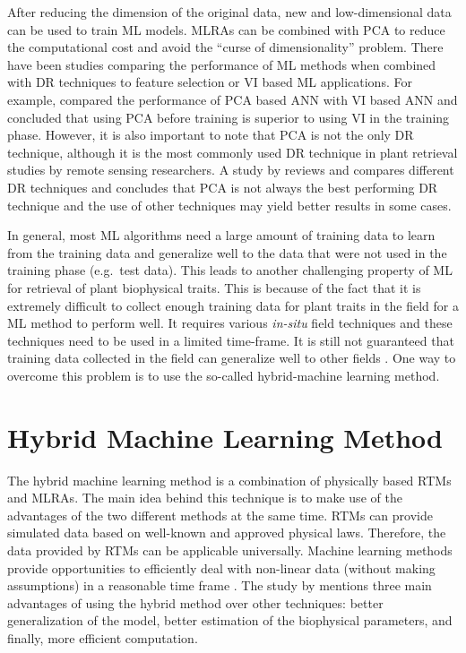 \documentclass[a4paper, twoside]{templates/ociamthesis}
\begin{document}
After reducing the dimension of the original data, new and low-dimensional data can be used to train ML models. MLRAs can be combined with PCA to reduce the computational cost and avoid the ``curse of dimensionality'' problem. There have been studies comparing the performance of ML methods when combined with DR techniques to feature selection or VI based ML applications. For example, \citet{liu2017hyperspectral} compared the performance of PCA based ANN with VI based ANN and concluded that using PCA before training is superior to using VI in the training phase. However, it is also important to note that PCA is not the only DR technique, although it is the most commonly used DR technique in plant retrieval studies by remote sensing researchers. A study by \citet{rivera2017hyperspectral} reviews and compares different DR techniques and concludes that PCA is not always the best performing DR technique and the use of other techniques may yield better results in some cases.

In general, most ML algorithms need a large amount of training data to learn from the training data and generalize well to the data that were not used in the training phase (e.g.~test data). This leads to another challenging property of ML for retrieval of plant biophysical traits. This is because of the fact that it is extremely difficult to collect enough training data for plant traits in the field for a ML method to perform well. It requires various \emph{in-situ} field techniques and these techniques need to be used in a limited time-frame. It is still not guaranteed that training data collected in the field can generalize well to other fields \citep{danner2021efficient}. One way to overcome this problem is to use the so-called hybrid-machine learning method.

\hypertarget{hml}{%
\chapter{Hybrid Machine Learning Method}\label{hml}}

The hybrid machine learning method is a combination of physically based RTMs and MLRAs. The main idea behind this technique is to make use of the advantages of the two different methods at the same time. RTMs can provide simulated data based on well-known and approved physical laws. Therefore, the data provided by RTMs can be applicable universally. Machine learning methods provide opportunities to efficiently deal with non-linear data (without making assumptions) in a reasonable time frame \citep{abdelbaki2021comparison, de2020quantifying, berger2021survey, ke2016estimating}. The study by \citet{fernandez2021hybrid} mentions three main advantages of using the hybrid method over other techniques: better generalization of the model, better estimation of the biophysical parameters, and finally, more efficient computation.
\end{document}
